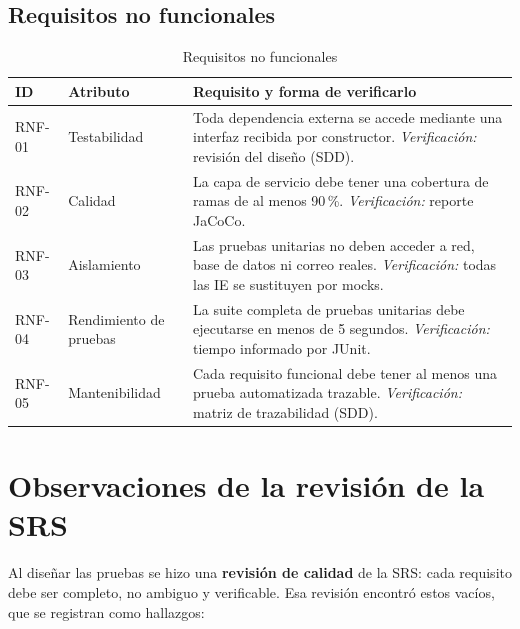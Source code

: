 \documentclass[11pt,a4paper,oneside]{report}
\begin{document}
\subsection{Requisitos no funcionales}
\begin{table}[H]
\centering
\caption{Requisitos no funcionales}
\begin{tabularx}{\linewidth}{llX}
\toprule
\textbf{ID} & \textbf{Atributo} & \textbf{Requisito y forma de verificarlo}\\
\midrule
RNF-01 & Testabilidad & Toda dependencia externa se accede mediante una interfaz recibida por constructor. \emph{Verificación:} revisión del diseño (SDD).\\
RNF-02 & Calidad & La capa de servicio debe tener una cobertura de ramas de al menos 90\,\%. \emph{Verificación:} reporte JaCoCo.\\
RNF-03 & Aislamiento & Las pruebas unitarias no deben acceder a red, base de datos ni correo reales. \emph{Verificación:} todas las IE se sustituyen por mocks.\\
RNF-04 & Rendimiento de pruebas & La suite completa de pruebas unitarias debe ejecutarse en menos de 5 segundos. \emph{Verificación:} tiempo informado por JUnit.\\
RNF-05 & Mantenibilidad & Cada requisito funcional debe tener al menos una prueba automatizada trazable. \emph{Verificación:} matriz de trazabilidad (SDD).\\
\bottomrule
\end{tabularx}
\end{table}

\section{Observaciones de la revisión de la SRS}
Al diseñar las pruebas se hizo una \textbf{revisión de calidad} de la SRS: cada requisito debe ser completo, no ambiguo y verificable. Esa revisión encontró estos vacíos, que se registran como hallazgos:
\end{document}
